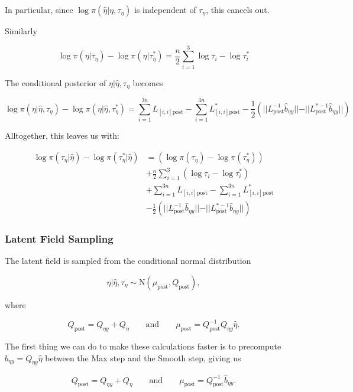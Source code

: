 \documentclass[
  letterpaper,
  DIV=11,
  numbers=noendperiod]{scrartcl}
\begin{document}
In particular, since \(\log\pi(\hat \eta \vert \eta, \tau_\eta)\) is
independent of \(\tau_\eta\), this cancels out.

Similarly

\[
\log\pi(\eta \vert \tau_\eta) - \log \pi(\eta \vert \tau_\eta^*) = \frac{n}{2}\sum_{i=1}^3 \log \tau_i - \log \tau_i^*
\]

The conditional posterior of \(\eta | \hat\eta, \tau_\eta\) becomes

\[
\log \pi(\eta \vert \hat \eta, \tau_\eta) - \log \pi(\eta \vert \hat \eta, \tau_\eta^*) = 
\sum_{i=1}^{3n} L_{[i,i] \text{post}} - \sum_{i=1}^{3n}L_{[i,i] \text{post}}^*  - 
\frac12\left( \vert\vert L_\text{post}^{-1}\hat b_{\eta y}\vert\vert - \vert\vert L_\text{post}^{*-1}\hat b_{\eta y}\vert\vert  \right)
\]

Alltogether, this leaves us with:

\[
\begin{aligned}
\log \pi(\tau_\eta \vert \hat \eta) - \log \pi(\tau_\eta^* \vert \hat \eta) &= 
\left( \log\pi(\tau_\eta) - \log\pi(\tau_\eta^*) \right)  \\ 
&+ \frac{n}{2}\sum_{i=1}^3\left( \log \tau_i - \log \tau_i^*\right) \\
&+ \sum_{i=1}^{3n} L_{[i,i] \text{post}} - \sum_{i=1}^{3n}L_{[i,i] \text{post}}^* \\
&- \frac12\left( \vert\vert L_\text{post}^{-1}\hat b_{\eta y}\vert\vert - \vert\vert L_\text{post}^{*-1}\hat b_{\eta y}\vert\vert  \right)
\end{aligned} 
\]

\subsubsection{Latent Field Sampling}\label{latent-field-sampling}

The latent field is sampled from the conditional normal distribution

\[
\eta \vert \hat\eta, \tau_\eta \sim \mathrm{N}(\mu_{\text{post}}, Q_{\text{post}}),
\]

where

\[
Q_{\text{post}} = Q_{\eta y} + Q_\eta
\qquad
\text{and}
\qquad
\mu_{\text{post}} = Q_{\text{post}}^{-1}Q_{\eta y}\hat\eta.
\]

The first thing we can do to make these calculations faster is to
precompute \(\hat b_{\eta y} = Q_{\eta y} \hat \eta\) between the Max
step and the Smooth step, giving us

\[
Q_{\text{post}} = Q_{\eta y} + Q_\eta
\qquad
\text{and}
\qquad
\mu_{\text{post}} = Q_{\text{post}}^{-1}\hat b_{\eta y}.
\]
\end{document}
